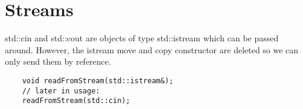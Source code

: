 \documentclass[11pt,twoside,a4paper]{report}
\begin{document}
\chapter{Streams}
std::cin and std::cout are objects of type std::istream which can be passed around. However, the istream move and copy constructor are deleted so we can only send them by reference.

\begin{lstlisting}
    void readFromStream(std::istream&);
    // later in usage:
    readFromStream(std::cin);
\end{lstlisting}
\end{document}
